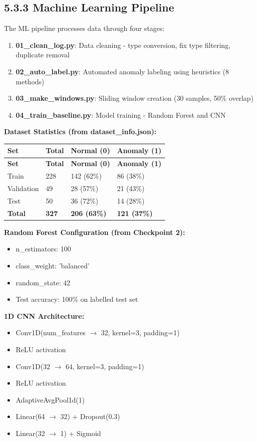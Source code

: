 \documentclass[12pt,a4paper]{article}
\begin{document}
\subsection{5.3.3 Machine Learning Pipeline}

The ML pipeline processes data through four stages:

\begin{enumerate}
    \item \textbf{01\_clean\_log.py}: Data cleaning - type conversion, fix type filtering, duplicate removal
    \item \textbf{02\_auto\_label.py}: Automated anomaly labeling using heuristics (8 methods)
    \item \textbf{03\_make\_windows.py}: Sliding window creation (30 samples, 50\% overlap)
    \item \textbf{04\_train\_baseline.py}: Model training - Random Forest and CNN
\end{enumerate}

\textbf{Dataset Statistics (from dataset\_info.json):}
\begin{longtable}{|p{3cm}|p{3cm}|p{3cm}|p{3cm}|}
\hline
\textbf{Set} & \textbf{Total} & \textbf{Normal (0)} & \textbf{Anomaly (1)} \\
\hline
\endfirsthead
\hline
\textbf{Set} & \textbf{Total} & \textbf{Normal (0)} & \textbf{Anomaly (1)} \\
\hline
\endhead
\hline
Train & 228 & 142 (62\%) & 86 (38\%) \\
\hline
Validation & 49 & 28 (57\%) & 21 (43\%) \\
\hline
Test & 50 & 36 (72\%) & 14 (28\%) \\
\hline
\textbf{Total} & \textbf{327} & \textbf{206 (63\%)} & \textbf{121 (37\%)} \\
\hline
\end{longtable}

\textbf{Random Forest Configuration (from Checkpoint 2):}
\begin{itemize}
    \item n\_estimators: 100
    \item class\_weight: 'balanced'
    \item random\_state: 42
    \item Test accuracy: 100\% on labelled test set
\end{itemize}

\textbf{1D CNN Architecture:}
\begin{itemize}
    \item Conv1D(num\_features $\rightarrow$ 32, kernel=3, padding=1)
    \item ReLU activation
    \item Conv1D(32 $\rightarrow$ 64, kernel=3, padding=1)
    \item ReLU activation
    \item AdaptiveAvgPool1d(1)
    \item Linear(64 $\rightarrow$ 32) + Dropout(0.3)
    \item Linear(32 $\rightarrow$ 1) + Sigmoid
\end{itemize}
\end{document}
